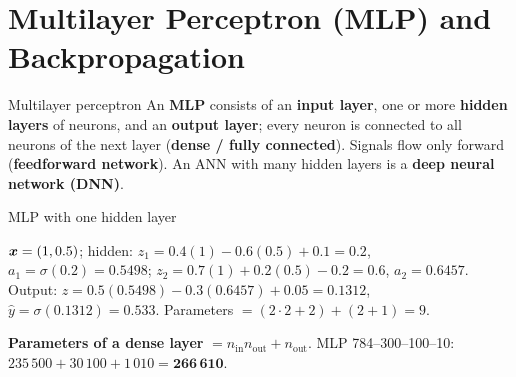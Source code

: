 \section{Multilayer Perceptron (MLP) and Backpropagation}
\begin{dfn}{Multilayer perceptron}
An \textbf{MLP} consists of an \textbf{input layer}, one or more \textbf{hidden layers} of neurons, and an \textbf{output layer}; every neuron is connected to all neurons of the next layer (\textbf{dense / fully connected}). Signals flow only forward (\textbf{feedforward network}). An ANN with many hidden layers is a \textbf{deep neural network (DNN)}.
\end{dfn}
\begin{drawit}{MLP with one hidden layer}
\centering
{}
\end{drawit}

\begin{numer}
$\boldsymbol{x}=(1,0.5)$; hidden: $z_1=0.4(1)-0.6(0.5)+0.1=0.2$, $a_1=\sigma(0.2)=0.5498$; $z_2=0.7(1)+0.2(0.5)-0.2=0.6$, $a_2=0.6457$.\\
Output: $z=0.5(0.5498)-0.3(0.6457)+0.05=0.1312$, $\hat y=\sigma(0.1312)=\mathbf{0.533}$. Parameters $=(2\cdot2+2)+(2+1)=9$.
\end{numer}
\textbf{Parameters of a dense layer} $=n_{\text{in}}n_{\text{out}}+n_{\text{out}}$. MLP 784--300--100--10: $235\,500+30\,100+1\,010=\mathbf{266\,610}$.

